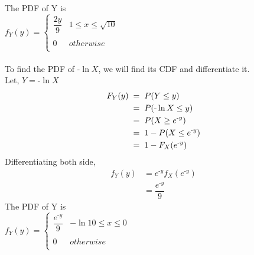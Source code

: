 \documentclass{article}
\begin{document}
\begin{enumerate}
  The PDF of Y is\\
  $f_Y(y) =  {  \left\{
    \begin{array}{ll}
      {\dfrac{2y}{9}}&  1\leq x\leq \sqrt{10} \\\\
      0 & otherwise \\
    \end{array}\right. }$\\\\
  To find the PDF of $ \text{-} \ln{X}$, we will find its CDF and differentiate it.\\
  Let, $Y = \text{-}\ln{X}$
  \begin{align*}
    F_Y(y)\hspace{1mm} =& \hspace{2mm}P(Y \leq y)\\
    =& \hspace{2mm}P(\text{-}\ln{X} \leq y)\\
    =& \hspace{2mm}P(X \geq e^{\text{-}y})\\
    =& \hspace{2mm}1 - P(X \leq e^{\text{-}y})\\
    =& \hspace{2mm}1 - F_X(e^{\text{-}y})
  \end{align*}
  Differentiating both side,
  \begin{align*}
    f_Y(y) &= e^{\text{-}y}f_X(e^{\text{-}y})\\
    &= \dfrac{e^{\text{-}y}}{9}
  \end{align*}
  The PDF of Y is\\
  $f_Y(y) =  {  \left\{
    \begin{array}{ll}
      {\dfrac{e^{\text{-}y}}{9}}&  -\ln{10}\leq x\leq 0 \\\\
      0 & otherwise \\
    \end{array}\right. }$

\end{enumerate}
\end{document}
